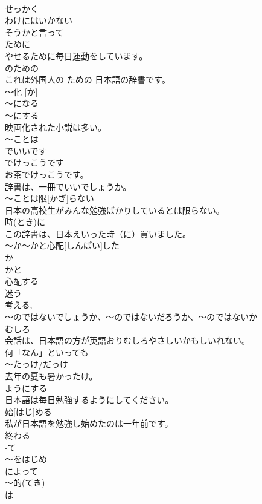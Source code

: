 \documentclass[8pt]{extreport}
\begin{document}
\begin{CJK}{UTF8}{min}
\\	せっかく	
\\	わけにはいかない	
\\	そうかと言って	
\\	ために	
\\	やせるために毎日運動をしています。
\\	のための 
\\	これは外国人の ための 日本語の辞書です。
\\	〜化 [か]	
\\	～になる 
\\	～にする 
\\	映画化された小説は多い。
\\	～ことは	
\\	でいいです 
\\	でけっこうです	
\\	お茶でけっこうです。
\\	辞書は、一冊でいいでしょうか。
\\	～ことは限[かぎ]らない	
\\	日本の高校生がみんな勉強ばかりしているとは限らない。
\\	時(とき)に	
\\	この辞書は、日本えいった時（に）買いました。
\\	～か～かと心配[しんぱい]した	
\\	か 
\\	かと 
\\	心配する 
\\	迷う 
\\	考える, 
\\	～のではないでしょうか、～のではないだろうか、～のではないか	
\\	むしろ	
\\	会話は、日本語の方が英語おりむしろやさしいかもしいれない。
\\	何「なん」といっても	
\\	～たっけ/だっけ	
\\	去年の夏も暑かったけ。
\\	ようにする	
\\	日本語は毎日勉強するようにしてください。
\\	始[はじ]める	
\\	私が日本語を勉強し始めたのは一年前です。
\\	終わる	
\\	-て 
\\	～をはじめ	
\\	によって	
\\	～的(てき)	
\\	は

\end{CJK}
\end{document}
